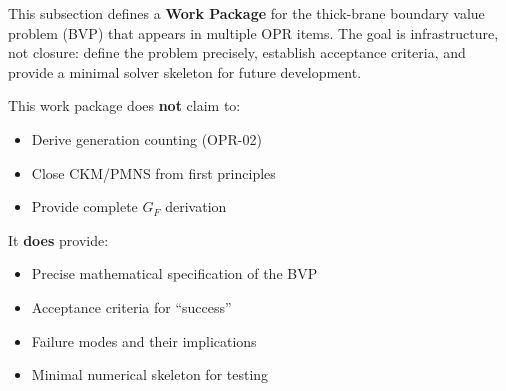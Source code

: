 
This subsection defines a \textbf{Work Package} for the thick-brane boundary value
problem (BVP) that appears in multiple OPR items. The goal is infrastructure, not
closure: define the problem precisely, establish acceptance criteria, and provide
a minimal solver skeleton for future development.

\begin{tcolorbox}[colback=yellow!5!white, colframe=yellow!60!black,
    title=\textbf{Scope Limitation}]
This work package does \textbf{not} claim to:
\begin{itemize}[nosep]
    \item Derive generation counting (OPR-02)
    \item Close CKM/PMNS from first principles
    \item Provide complete $G_F$ derivation
\end{itemize}
It \textbf{does} provide:
\begin{itemize}[nosep]
    \item Precise mathematical specification of the BVP
    \item Acceptance criteria for ``success''
    \item Failure modes and their implications
    \item Minimal numerical skeleton for testing
\end{itemize}
\end{tcolorbox}


